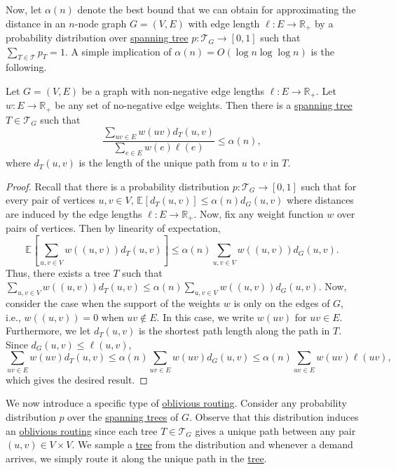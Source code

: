 Now, let \(\alpha (n)\) denote the best bound that we can obtain for approximating the distance in an \(n\)-node graph \(G = (V, E)\) with edge length \(\ell \colon E \to \mathbb{R} _{+}\) by a probability distribution over \hyperref[def:spanning-tree]{spanning tree} \(p\colon \mathcal{T} _G \to [0, 1]\) such that \(\sum_{T \in \mathcal{T} } p_T = 1\). A simple implication of \(\alpha (n) = O(\log n \log \log n)\) is the following.

\begin{lemma}\label{lma:oblivious-routing-distortion}
	Let \(G = (V, E)\) be a graph with non-negative edge lengths \(\ell \colon E \to \mathbb{R} _{+}\). Let \(w \colon E \to \mathbb{R} _{+}\) be any set of no-negative edge weights. Then there is a \hyperref[def:spanning-tree]{spanning tree} \(T \in \mathcal{T} _G\) such that
	\[
		\frac{\sum_{uv \in E} w(uv) d_T(u, v)}{\sum_{e \in E} w(e) \ell (e) }
		\leq \alpha (n),
	\]
	where \(d_T(u, v)\) is the length of the unique path from \(u\) to \(v\) in \(T\).
\end{lemma}
\begin{proof}
	Recall that there is a probability distribution \(p \colon \mathcal{T} _G \to [0, 1]\) such that for every pair of vertices \(u, v \in V\), \(\mathbb{E}_{}[d_T(u, v)] \leq \alpha (n) d_G(u, v)\) where distances are induced by the edge lengths \(\ell \colon E \to \mathbb{R} _{+}\). Now, fix any weight function \(w\) over pairs of vertices. Then by linearity of expectation,
	\[
		\mathbb{E}_{}\left[\sum_{u, v \in V} w((u, v)) d_T(u, v)\right]
		\leq \alpha (n) \sum_{u, v \in V} w((u, v)) d_G(u, v).
	\]
	Thus, there exists a tree \(T\) such that \(\sum_{u, v \in V} w((u, v)) d_T(u, v) \leq \alpha (n) \sum_{u, v \in V} w((u, v)) d_G(u, v)\). Now, consider the case when the support of the weights \(w\) is only on the edges of \(G\), i.e., \(w((u, v)) = 0\) when \(uv \notin E\). In this case, we write \(w(uv)\) for \(uv \in E\). Furthermore, we let \(d_T(u, v)\) is the shortest path length along the path in \(T\). Since \(d_G(u, v) \leq \ell (u, v)\),
	\[
		\sum_{uv \in E} w(uv) d_T(u, v)
		\leq \alpha (n) \sum_{uv \in E} w(uv) d_G(u, v)
		\leq \alpha (n) \sum_{uv \in E} w(uv) \ell (uv),
	\]
	which gives the desired result.
\end{proof}

We now introduce a specific type of \hyperref[def:oblivious-routing-scheme]{oblivious routing}. Consider any probability distribution \(p\) over the \hyperref[def:spanning-tree]{spanning trees} of \(G\). Observe that this distribution induces an \hyperref[prb:oblivious-routing]{oblivious routing} since each tree \(T \in \mathcal{T} _G\) gives a unique path between any pair \((u, v) \in V \times V\). We sample a \hyperref[def:spanning-tree]{tree} from the distribution and whenever a demand arrives, we simply route it along the unique path in the \hyperref[def:spanning-tree]{tree}.

